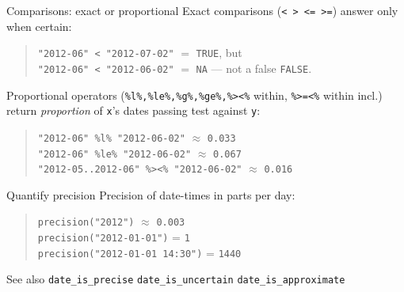 \documentclass[9pt]{extarticle}
\let\code\verb
\begin{document}
\begin{minipage}[t]{0.323\textwidth}
\begin{mdbox}{Comparisons: exact or proportional}
Exact comparisons (\code|< > <= >=|) answer only when certain:
\begin{quote}
\code|"2012-06" < "2012-07-02"| $=$ \code|TRUE|, but\\
\code|"2012-06" < "2012-06-02"| $=$ \code|NA| — not a false \code|FALSE|.
\end{quote}
Proportional operators (\code|%
dates passing test against \code|y|:
\begin{quote}
\code|"2012-06" %
\code|"2012-06" %
\code|"2012-05..2012-06" %
\end{quote}
\end{mdbox}

\begin{mdbox}{Quantify precision}
Precision of date-times in parts per day:
\begin{quote}
\code|precision("2012")| $\approx$ \code|0.003|\\
\code|precision("2012-01-01")| = \code|1|\\
\code|precision("2012-01-01 14:30")| = \code|1440|
\end{quote}
See also \code|date_is_precise| \code|date_is_uncertain| \code|date_is_approximate|
\end{mdbox}

\end{minipage}\hfill
%
\end{document}
